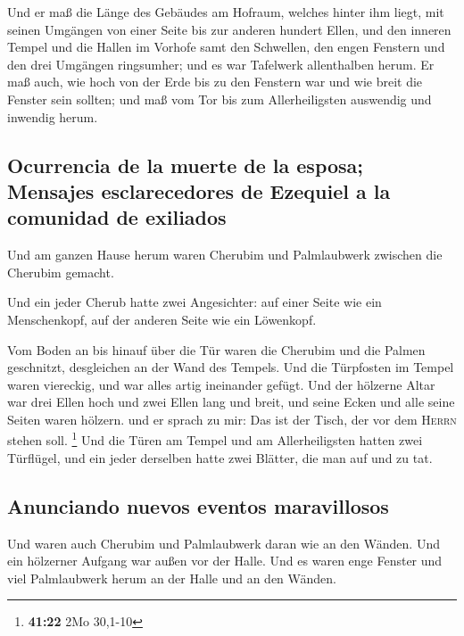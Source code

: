  Und er maß die Länge des Gebäudes am Hofraum, welches
hinter ihm liegt, mit seinen Umgängen von einer Seite bis zur anderen
hundert Ellen, und den inneren Tempel und die Hallen im Vorhofe
 samt den Schwellen, den engen Fenstern und den drei
Umgängen ringsumher; und es war Tafelwerk allenthalben herum.
 Er maß auch, wie hoch von der Erde bis zu den Fenstern
war und wie breit die Fenster sein sollten; und maß vom Tor bis zum
Allerheiligsten auswendig und inwendig herum.

\hypertarget{ocurrencia-de-la-muerte-de-la-esposa-mensajes-esclarecedores-de-ezequiel-a-la-comunidad-de-exiliados}{%
\subsection{Ocurrencia de la muerte de la esposa; Mensajes
esclarecedores de Ezequiel a la comunidad de
exiliados}\label{ocurrencia-de-la-muerte-de-la-esposa-mensajes-esclarecedores-de-ezequiel-a-la-comunidad-de-exiliados}}

 Und am ganzen Hause herum waren Cherubim und
Palmlaubwerk zwischen die Cherubim gemacht.

 Und ein jeder Cherub hatte zwei Angesichter: auf einer
Seite wie ein Menschenkopf, auf der anderen Seite wie ein Löwenkopf.

 Vom Boden an bis hinauf über die Tür waren die Cherubim
und die Palmen geschnitzt, desgleichen an der Wand des Tempels.
 Und die Türpfosten im Tempel waren viereckig, und war
alles artig ineinander gefügt.  Und der hölzerne Altar
war drei Ellen hoch und zwei Ellen lang und breit, und seine Ecken und
alle seine Seiten waren hölzern. und er sprach zu mir: Das ist der
Tisch, der vor dem \textsc{Herrn} stehen soll. \footnote{\textbf{41:22}
  2Mo 30,1-10}  Und die Türen am Tempel und am
Allerheiligsten  hatten zwei Türflügel, und ein jeder
derselben hatte zwei Blätter, die man auf und zu tat.

\hypertarget{anunciando-nuevos-eventos-maravillosos}{%
\subsection{Anunciando nuevos eventos
maravillosos}\label{anunciando-nuevos-eventos-maravillosos}}

 Und waren auch Cherubim und Palmlaubwerk daran wie an
den Wänden. Und ein hölzerner Aufgang war außen vor der Halle.
 Und es waren enge Fenster und viel Palmlaubwerk herum an
der Halle und an den Wänden.

